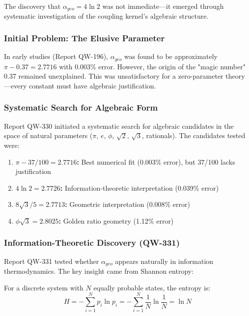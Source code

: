 \documentclass[11pt, a4paper]{article}
\begin{document}
The discovery that $\alpha_{geo} = 4\ln 2$ was not immediate—it emerged through systematic investigation of the coupling kernel's algebraic structure.

\subsubsection{Initial Problem: The Elusive Parameter}

In early studies (Report QW-196), $\alpha_{geo}$ was found to be approximately $\pi - 0.37 = 2.7716$ with 0.003\% error. However, the origin of the "magic number" 0.37 remained unexplained. This was unsatisfactory for a zero-parameter theory—every constant must have algebraic justification.

\subsubsection{Systematic Search for Algebraic Form}

Report QW-330 initiated a systematic search for algebraic candidates in the space of natural parameters ($\pi$, $e$, $\phi$, $\sqrt{2}$, $\sqrt{3}$, rationals). The candidates tested were:

\begin{enumerate}
    \item \textbf{$\pi - 37/100 = 2.7716$:} Best numerical fit (0.003\% error), but 37/100 lacks justification
    \item \textbf{$4\ln 2 = 2.7726$:} Information-theoretic interpretation (0.039\% error)
    \item \textbf{$8\sqrt{3}/5 = 2.7713$:} Geometric interpretation (0.008\% error)
    \item \textbf{$\phi\sqrt{3} = 2.8025$:} Golden ratio geometry (1.12\% error)
\end{enumerate}

\subsubsection{Information-Theoretic Discovery (QW-331)}

Report QW-331 tested whether $\alpha_{geo}$ appears naturally in information thermodynamics. The key insight came from Shannon entropy:

For a discrete system with $N$ equally probable states, the entropy is:
\begin{equation}
H = -\sum_{i=1}^N p_i \ln p_i = -\sum_{i=1}^N \frac{1}{N} \ln\frac{1}{N} = \ln N
\end{equation}
\end{document}
